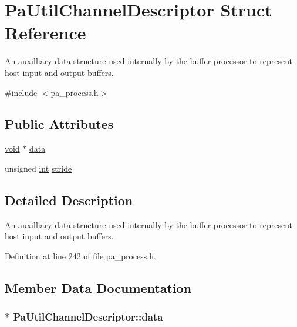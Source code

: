 \hypertarget{struct_pa_util_channel_descriptor}{}\section{Pa\+Util\+Channel\+Descriptor Struct Reference}
\label{struct_pa_util_channel_descriptor}


An auxilliary data structure used internally by the buffer processor to represent host input and output buffers.  




{\ttfamily \#include $<$pa\+\_\+process.\+h$>$}

\subsection*{Public Attributes}
\begin{DoxyCompactItemize}
\item 
\hyperlink{sound_8c_ae35f5844602719cf66324f4de2a658b3}{void} $\ast$ \hyperlink{struct_pa_util_channel_descriptor_a4304aa36eb3b1655d4eb14a6bd5f4872}{data}
\item 
unsigned \hyperlink{xmltok_8h_a5a0d4a5641ce434f1d23533f2b2e6653}{int} \hyperlink{struct_pa_util_channel_descriptor_a9c9ef6ca4556396d20eac3eebb81e27b}{stride}
\end{DoxyCompactItemize}


\subsection{Detailed Description}
An auxilliary data structure used internally by the buffer processor to represent host input and output buffers. 

Definition at line 242 of file pa\+\_\+process.\+h.



\subsection{Member Data Documentation}
\subsubsection[{\texorpdfstring{data}{data}}]{$\ast$ Pa\+Util\+Channel\+Descriptor\+::data}\hypertarget{struct_pa_util_channel_descriptor_a4304aa36eb3b1655d4eb14a6bd5f4872}{}\label{struct_pa_util_channel_descriptor_a4304aa36eb3b1655d4eb14a6bd5f4872}


